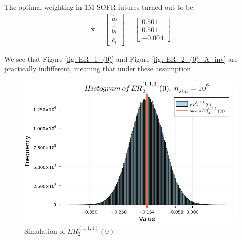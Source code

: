 The optimal weighting in 1M-SOFR futures turned out to be:
\begin{align*}
\hat{\mathbf{x}} = 
\begin{bmatrix}
\hat{a}_{t} \\
\hat{b}_{t} \\
\hat{c}_{t}
\end{bmatrix}
= 
\begin{bmatrix}
0.501 \\
0.501 \\
-0.004
\end{bmatrix}
\end{align*}

\newpage 

We see that Figure \ref{fig: ER_1_(0)} and Figure \ref{fig: ER_2_(0)_A_inv} are practically indifferent, meaning that under these assumption

\begin{figure}[htp]
    \centering
    \includegraphics[width=12cm]{figures/SOFR/ER_2(0)_111.PNG}
    \caption{Simulation of $ER_{2}^{(1,1,1)}(0)$}
    \label{fig: ER_2_1_1_1}
\end{figure}


